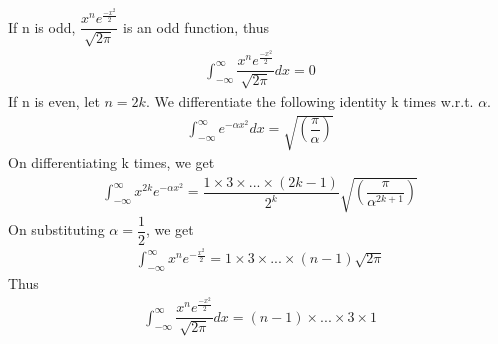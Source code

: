 If n is odd, $\dfrac{x^n e^{\frac{-x^2}{2}}}{\sqrt{2\pi}}$ is an odd function, thus
\begin{align}
    \int_{-\infty}^{\infty} \dfrac{x^n e^{\frac{-x^2}{2}}}{\sqrt{2\pi}}dx = 0
\end{align}
If n is even, let $n = 2k$. We differentiate the following identity k times w.r.t. $\alpha$.
\begin{align}
    \int_{-\infty}^{\infty}e^{-\alpha x^2}dx = \sqrt{\left( \dfrac{\pi}{\alpha}\right)}
\end{align}
On differentiating k times, we get
\begin{align}
    \int_{-\infty}^{\infty}x^{2k}e^{-\alpha x^2} = \dfrac{1\times3\times...\times(2k-1)}{2^k}  \sqrt{\left(\dfrac{\pi}{\alpha^{2k+1}}\right)}
\end{align}
On substituting $\alpha = \dfrac{1}{2}$, we get
\begin{align}
    \int_{-\infty}^{\infty}x^{n}e^{-\frac{x^2}{2}} = 1\times3\times...\times(n-1) \sqrt{2 \pi}
\end{align}
Thus
\begin{align}
     \int_{-\infty}^{\infty} \dfrac{x^n e^{\frac{-x^2}{2}}}{\sqrt{2\pi}}dx = (n-1)\times...\times3\times1
\end{align}
